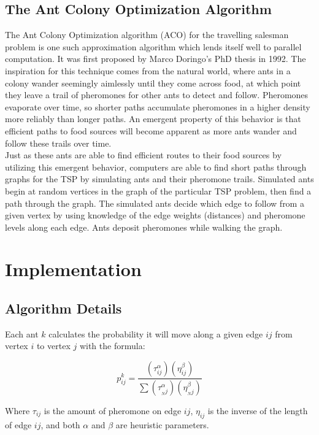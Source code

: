 \documentclass[twocolumn]{article}
\begin{document}
\subsection{The Ant Colony Optimization Algorithm}

The Ant Colony Optimization algorithm (ACO) for the travelling salesman problem 
is one such approximation algorithm which lends itself well to parallel 
computation. It was first proposed by Marco Doringo's PhD thesis in 1992. The 
inspiration for this technique comes from the natural world, where ants in a
colony wander seemingly aimlessly until they come across food, at which point
they leave a trail of pheromones for other ants to detect and follow. Pheromones
evaporate over time, so shorter paths accumulate pheromones in a higher density 
more reliably than longer paths. An emergent property of this behavior is that 
efficient paths to food sources will become apparent as more ants wander and 
follow these trails over time.\\

Just as these ants are able to find efficient routes to their food sources by
utilizing this emergent behavior, computers are able to find short paths through
graphs for the TSP by simulating ants and their pheromone trails. Simulated ants
begin at random vertices in the graph of the particular TSP problem, then find a
path through the graph. The simulated ants decide which edge to follow from a
given vertex by using knowledge of the edge weights (distances) and pheromone
levels along each edge. Ants deposit pheromones while walking the graph. \\


\section{Implementation}

\subsection{Algorithm Details}

Each ant $k$ calculates the probability it will move along a given edge $ij$ 
from vertex $i$ to vertex $j$ with the formula:

{\large\begin{equation}p^k_{ij}=\frac{(\tau^\alpha_{ij})(\eta^\beta_{ij})}
{\sum(\tau^\alpha_{{_N}j})(\eta^\beta_{{_N}j})}\end{equation}} 

Where $\tau_{ij}$ is the amount of pheromone on edge $ij$, $\eta_{ij}$ is the
inverse of the length of edge $ij$, and both {$\alpha$} and {$\beta$} are 
heuristic parameters. \\
\end{document}
